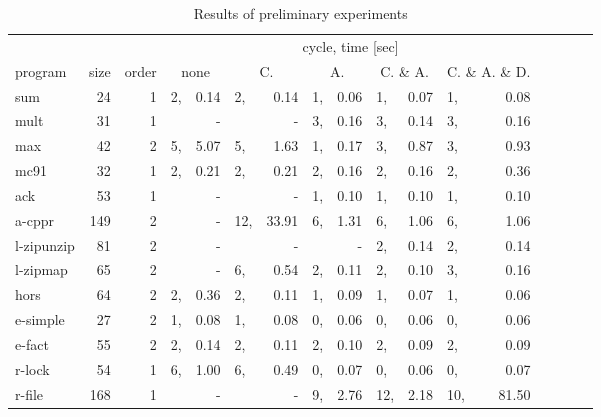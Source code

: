 \begin{table*}
\caption{Results of preliminary experiments }
\label{tbl:exp}
\small
\begin{center}
\begin{tabular}{|l|r|r|p{0pt}r|p{0pt}r|p{0pt}r|p{0pt}r|p{0pt}r|p{0pt}r|p{0pt}r|}
\hline
            &       &    & \multicolumn{10}{|c|}{cycle, time [sec]} \\
\cline{4-13}
program    & size & order & \multicolumn{2}{c}{none} &     \multicolumn{2}{|c|}{C.} &   \multicolumn{2}{|c|}{A.} & \multicolumn{2}{|c|}{C. \& A.} & \multicolumn{2}{|c|}{C. \& A. \& D.} \\
\hline
sum               &    24&  1&  2, &    0.14 &  2, &    0.14 &  1, &    0.06 &  1, &    0.07 &  1, &    0.08 \\
mult              &    31&  1&           & - &           & - &  3, &    0.16 &  3, &    0.14 &  3, &    0.16 \\
max               &    42&  2&  5, &    5.07 &  5, &    1.63 &  1, &    0.17 &  3, &    0.87 &  3, &    0.93 \\
mc91              &    32&  1&  2, &    0.21 &  2, &    0.21 &  2, &    0.16 &  2, &    0.16 &  2, &    0.36 \\
ack               &    53&  1&           & - &           & - &  1, &    0.10 &  1, &    0.10 &  1, &    0.10 \\
a-cppr            &   149&  2&           & - & 12, &   33.91 &  6, &    1.31 &  6, &    1.06 &  6, &    1.06 \\
l-zipunzip        &    81&  2&           & - &           & - &           & - &  2, &    0.14 &  2, &    0.14 \\
l-zipmap          &    65&  2&           & - &  6, &    0.54 &  2, &    0.11 &  2, &    0.10 &  3, &    0.16 \\
hors              &    64&  2&  2, &    0.36 &  2, &    0.11 &  1, &    0.09 &  1, &    0.07 &  1, &    0.06 \\
e-simple          &    27&  2&  1, &    0.08 &  1, &    0.08 &  0, &    0.06 &  0, &    0.06 &  0, &    0.06 \\
e-fact            &    55&  2&  2, &    0.14 &  2, &    0.11 &  2, &    0.10 &  2, &    0.09 &  2, &    0.09 \\
r-lock            &    54&  1&  6, &    1.00 &  6, &    0.49 &  0, &    0.07 &  0, &    0.06 &  0, &    0.07 \\
r-file            &   168&  1&           & - &           & - &  9, &    2.76 & 12, &    2.18 & 10, &   81.50 \\

\end{tabular}
\end{center}
\end{table*}
